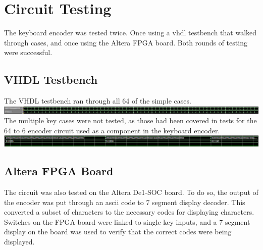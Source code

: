 \documentclass[report2]{subfiles}
\begin{document}
\section{Circuit Testing}
The keyboard encoder was tested twice. Once using a vhdl testbench that walked through cases, and once using the Altera FPGA board. Both rounds of testing were successful. \\
\subsection{VHDL Testbench}
The VHDL testbench ran through all 64 of the simple cases. \\
\includegraphics[width=\textwidth]{keyboard_full_test}
The multiple key cases were not tested, as those had been covered in tests for the 64 to 6 encoder circuit used as a component in the keyboard encoder. \\
\includegraphics[width=\textwidth]{64_6_spec_test}
\subsection{Altera FPGA Board}
The circuit was also tested on the Altera De1-SOC board. To do so, the output of the encoder was put through an ascii code to 7 segment display decoder. This converted a subset of characters to the necessary codes for displaying characters. Switches on the FPGA board were linked to single key inputs, and a 7 segment display on the board was used to verify that the correct codes were being displayed. \\
\end{document}
